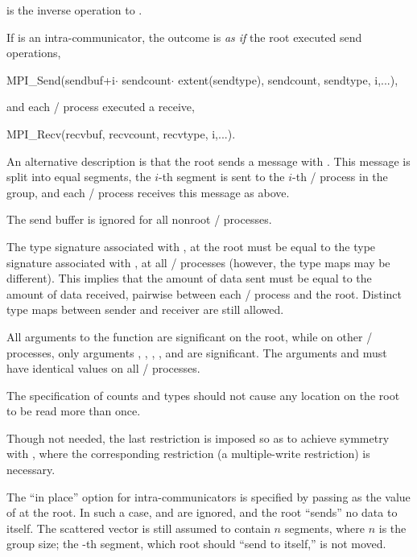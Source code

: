  is the inverse operation to .

If  is an intra-communicator,
the outcome is \emph{as if} the root executed  send operations,
\begin{mpicodeblock}
MPI\_Send(sendbuf+i$\cdot$ sendcount$\cdot$ extent(sendtype), sendcount,
sendtype, i,...),
\end{mpicodeblock}
\noindent and each \MPI/ process executed a receive,
\begin{mpicodeblock}
MPI\_Recv(recvbuf, recvcount, recvtype, i,...).
\end{mpicodeblock}

An alternative description is that the root sends a message with
. This
message is split into  equal segments, the
$i$-th
segment is
sent to the
$i$-th
\MPI/ process in the group, and each \MPI/ process receives
this message as above.

The send buffer is ignored for all nonroot \MPI/ processes.

The type signature associated with ,  at the root
must be equal to the type signature associated with
,  at all
\MPI/ processes (however, the type maps may be different).
This implies that the amount of data sent must be equal to the
amount of data received, pairwise between each \MPI/ process and the root.
Distinct type maps between sender and receiver are still allowed.

All arguments to the function are significant on the root,
while on other \MPI/ processes, only arguments , ,
, ,
and
 are significant.
The arguments  and 
must have identical values on all \MPI/ processes.

The specification of counts and types
should not cause any location on the root to be read more than
once.

\begin{rationale}
Though not needed, the last restriction is imposed so as
to achieve symmetry with
, where the corresponding restriction (a multiple-write
restriction) is necessary.
\end{rationale}

The ``in place'' option  for intra-communicators is specified by passing
 as
the value of  at the root.  In such a
case,
 and  are ignored, and the root
``sends'' no data to itself. The scattered vector is still assumed to
contain $n$ segments, where $n$ is the group size; the -th
segment, which root should ``send to itself,'' is not moved.

